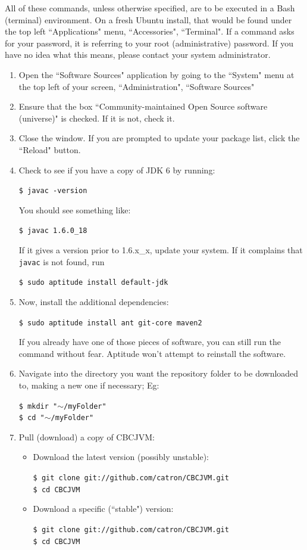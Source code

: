 \documentclass[12pt,letterpaper]{article}
\newcommand{\code}[1]{\par\texttt{#1}\par}
\begin{document}
All of these commands, unless otherwise specified, are to be executed in a Bash (terminal) environment. On a fresh Ubuntu install, that would be found under the top left ``Applications" menu, ``Accessories", ``Terminal". If a command asks for your password, it is referring to your root (administrative) password. If you have no idea what this means, please contact your system administrator.
\begin{enumerate}
\item Open the ``Software Sources" application by going to the ``System" menu at the top left of your screen, ``Administration", ``Software Sources"
\item Ensure that the box ``Community-maintained Open Source software (universe)" is checked. If it is not, check it.
\item Close the window. If you are prompted to update your package list, click the ``Reload" button.
\item Check to see if you have a copy of JDK 6 by running:
      \code{\$ javac -version}
      You should see something like:
      \code{\$ javac 1.6.0{\_}18}
      If it gives a version prior to 1.6.x{\_}x, update your system. If it complains that \texttt{javac} is not found, run
      \code{\$ sudo aptitude install default-jdk}
\item Now, install the additional dependencies:
      \code{\$ sudo aptitude install ant git-core maven2}
      If you already have one of those pieces of software, you can still run the command without fear. Aptitude won't attempt to reinstall the software.
\item Navigate into the directory you want the repository folder to be downloaded to, making a new one if necessary; Eg:
      \code{\$ mkdir "$\mathtt{\sim}$/myFolder"\\
            \$ cd "$\mathtt{\sim}$/myFolder"}
\item Pull (download) a copy of CBCJVM:\par
      \begin{itemize}
          \item Download the latest version (possibly unstable):
                \code{\$ git clone git://github.com/catron/CBCJVM.git \\
                      \$ cd CBCJVM}
          \item Download a specific (``stable") version:
                \code{\$ git clone git://github.com/catron/CBCJVM.git \\
                      \$ cd CBCJVM \\
}
\end{itemize}
\end{enumerate}
\end{document}
